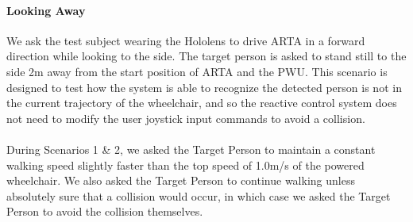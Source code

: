 \paragraph{Looking Away} We ask the test subject wearing the Hololens to drive ARTA in a forward direction while looking to the side. The target person is asked to stand still to the side 2m away from the start position of ARTA and the PWU. This scenario is designed to test how the system is able to recognize the detected person is not in the current trajectory of the wheelchair, and so the reactive control system does not need to modify the user joystick input commands to avoid a collision.

\paragraph{} During Scenarios 1 \& 2, we asked the Target Person to maintain a constant walking speed slightly faster than the top speed of 1.0m/s of the powered wheelchair. We also asked the Target Person to continue walking unless absolutely sure that a collision would occur, in which case we asked the Target Person to avoid the collision themselves.

